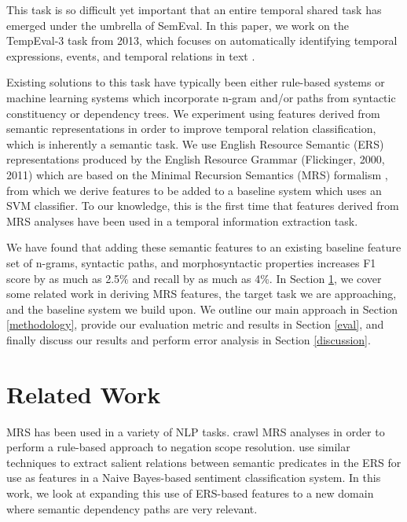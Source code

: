 \documentclass[11pt]{article}
\begin{document}
This task is so difficult yet important that an entire temporal shared task has emerged under the umbrella of SemEval. In this paper, we work on the TempEval-3 task from 2013, which focuses on automatically identifying temporal expressions, events, and temporal relations in text \cite{UzZaman:13}.

Existing solutions to this task have typically been either rule-based systems or machine learning systems which incorporate n-gram and/or paths from syntactic constituency or dependency trees. We experiment using features derived from semantic representations in order to improve temporal relation classification, which is inherently a semantic task. We use English Resource Semantic (ERS) representations produced by the English Resource Grammar (Flickinger, 2000, 2011) which are based on the Minimal Recursion Semantics (MRS) formalism \cite{Copestake:05}, from which we derive features to be added to a baseline system which uses an SVM classifier. To our knowledge, this is the first time that features derived from MRS analyses have been used in a temporal information extraction task.

We have found that adding these semantic features to an existing baseline feature set of n-grams, syntactic paths, and morphosyntactic properties increases F1 score by as much as 2.5\% and recall by as much as 4\%. In Section \ref{related-work}, we cover some related work in deriving MRS features, the target task we are approaching, and the baseline system we build upon. We outline our main approach in Section \ref{methodology}, provide our evaluation metric and results in Section \ref{eval}, and finally discuss our results and perform error analysis in Section \ref{discussion}.


\section{Related Work}
\label{related-work}


MRS has been used in a variety of NLP tasks.  crawl MRS analyses in order to perform a rule-based approach to negation scope resolution.  use similar techniques to extract salient relations between semantic predicates in the ERS for use as features in a Naive Bayes-based sentiment classification system. In this work, we look at expanding this use of ERS-based features to a new domain where semantic dependency paths are very relevant.
\end{document}
